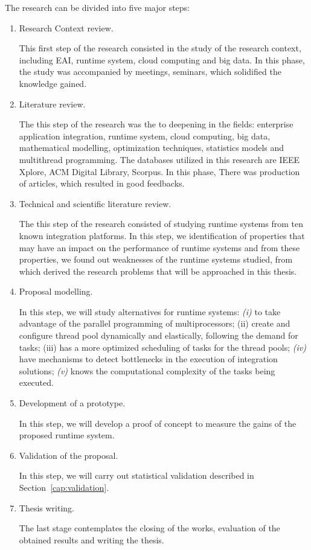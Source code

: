 The research can be divided into five major steps:
\begin{enumerate}
\item Research Context review. 

This first step of the research consisted in the study of the research context, including EAI, runtime system, cloud computing and big data. In this phase, the study was accompanied by meetings, seminars, which solidified the knowledge gained.
\item Literature review. 

The this step of the research was the to deepening in the fields: enterprise application integration, runtime system, cloud computing, big data, mathematical modelling, optimization techniques, statistics models and multithread programming. The databases utilized in this research are IEEE Xplore, ACM Digital Library, Scorpus. In this phase, There was production of articles, which resulted in good feedbacks.
\item Technical and scientific literature review.

The this step of the research consisted of studying runtime systems from ten known integration platforms. In this step, we identification of properties that may have an impact on the performance of runtime systems and from these properties, we found out weaknesses of the runtime systems studied, from which derived the research problems that will be approached in this thesis.
\item Proposal modelling.

In this step, we will study alternatives for runtime systems: \textit{(i)} to take advantage of the parallel programming of multiprocessors; (ii) create and configure thread pool dynamically and elastically, following the demand for tasks; (iii) has a more optimized scheduling of tasks for the thread pools; \textit{(iv)} have mechanisms to detect bottlenecks in the execution of integration solutions; \textit{(v)} knows the computational complexity of the tasks being executed.

\item Development of a prototype.

In this step, we will develop a proof of concept to measure the gains of the proposed runtime system.
\item Validation of the proposal.

In this step, we will carry out statistical validation described in Section~\ref{cap:validation}.
\item Thesis writing.

The last stage contemplates the closing of the works, evaluation of the obtained results and writing the thesis. 
\end{enumerate}